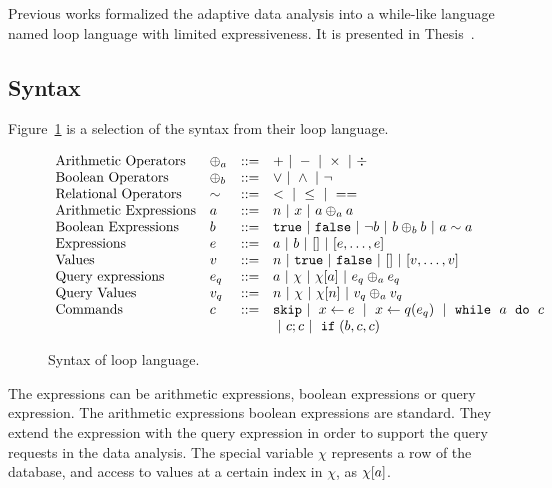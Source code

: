 Previous works formalized the adaptive data analysis into a while-like language named loop language with  limited expressiveness.
It is presented in {Thesis~\cite{weihao22}}.
\subsection*{Syntax}
Figure~\ref{fig:prework_syntax} is a selection of the syntax from their loop language.
{\small
\begin{figure}
\[
\begin{array}{llll}
 \mbox{Arithmetic Operators} & \oplus_a & ::= & + ~|~ - ~|~ \times 
%
~|~ \div \\  
  \mbox{Boolean Operators} & \oplus_b & ::= & \lor ~|~ \land ~|~ \neg\\
   \mbox{Relational Operators} & \sim & ::= & < ~|~ \leq ~|~ == \\  
\mbox{Arithmetic Expressions} & \aexpr & ::= & 
	n ~|~ x ~|~ \aexpr \oplus_a \aexpr  \\
\mbox{Boolean Expressions} & \bexpr & ::= & 
	\etrue ~|~ \efalse  ~|~ \neg \bexpr
	 ~|~ \bexpr \oplus_b \bexpr
	~|~ \aexpr \sim \aexpr \\
\mbox{Expressions} & \expr & ::= & \aexpr ~|~ \bexpr ~|~ [] ~|~ [\expr, \dots, \expr] \\	
\mbox{Values} & v & ::= & n ~|~ \etrue ~|~ \efalse ~|~ [] ~|~ [v, \dots, v] \\
\mbox{Query expressions} & \expr_q & ::= & \aexpr ~|~ \chi ~|~ \chi[\aexpr] ~|~ \expr_q \oplus_a \expr_q \\
\mbox{Query Values} & v_q & ::= & n ~|~ \chi ~|~ \chi[n] ~|~ v_q \oplus_a  v_q \\
\mbox{Commands} & c & ::= &  \eskip  ~|~  \assign x \expr ~|~  \assign{x}{ q(\expr_q)}
%
~|~ \eloop ~ \aexpr  ~ \edo ~ c  \\ &&& ~|~ c;c  ~|~ \eif(\bexpr, c, c)
\end{array}
\]
 \caption{Syntax of loop language.}
    \label{fig:prework_syntax}
\end{figure}
}
The expressions can be arithmetic expressions, boolean expressions or query expression.
The arithmetic expressions boolean expressions are standard.
They extend the expression with the query expression in order to support the query requests in the data analysis.
The special variable $\chi$ represents a row of the database,
and access to values at a certain index in $\chi$, as $\chi[a]$.

